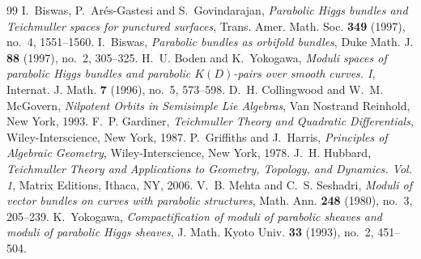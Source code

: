 \documentclass[10pt,a4paper]{amsart}
\numberwithin{equation}{section}
\begin{document}
\begin{thebibliography}{99}
 I.~Biswas, P.~Ar\'es-Gastesi and S.~Govindarajan, \emph{Parabolic Higgs bundles and Teichmuller spaces for punctured surfaces}, Trans. Amer. Math. Soc. \textbf{349} (1997), no.~4, 1551--1560.
 I.~Biswas, \emph{Parabolic bundles as orbifold bundles}, Duke Math. J. \textbf{88} (1997), no.~2, 305--325.
 H.~U. Boden and K.~Yokogawa, \emph{Moduli spaces of parabolic Higgs bundles and parabolic \(K(D)\)-pairs over smooth curves. I}, Internat. J. Math. \textbf{7} (1996), no.~5, 573--598.
 D.~H. Collingwood and W.~M. McGovern, \emph{Nilpotent Orbits in Semisimple Lie Algebras}, Van Nostrand Reinhold, New York, 1993.
 F.~P. Gardiner, \emph{Teichmuller Theory and Quadratic Differentials}, Wiley-Interscience, New York, 1987.
 P.~Griffiths and J.~Harris, \emph{Principles of Algebraic Geometry}, Wiley-Interscience, New York, 1978.
 J.~H. Hubbard, \emph{Teichmuller Theory and Applications to Geometry, Topology, and Dynamics. Vol. 1}, Matrix Editions, Ithaca, NY, 2006.
 V.~B. Mehta and C.~S. Seshadri, \emph{Moduli of vector bundles on curves with parabolic structures}, Math. Ann. \textbf{248} (1980), no.~3, 205--239.
 K.~Yokogawa, \emph{Compactification of moduli of parabolic sheaves and moduli of parabolic Higgs sheaves}, J. Math. Kyoto Univ. \textbf{33} (1993), no.~2, 451--504.
\end{thebibliography}
\end{document}
